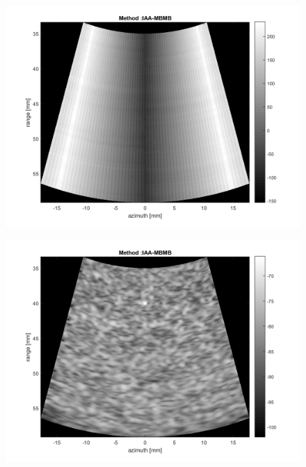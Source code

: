 \begin{figure}[ht]
    \centering
    \begin{minipage}[b]{0.3\linewidth}
        \includegraphics[width=\linewidth]{./images/background/IAA-MBMB_low_nsd.png}
        \label{fig:nsd_10}
    \end{minipage}
    \quad
    \begin{minipage}[b]{0.3\linewidth}
        \includegraphics[width=\linewidth]{./images/background/IAA-MBMB_right_nsd.png}
        \label{fig:nsd_31}
    \end{minipage}
    \quad
    \begin{minipage}[b]{0.3\linewidth}

\end{minipage}
\end{figure}

